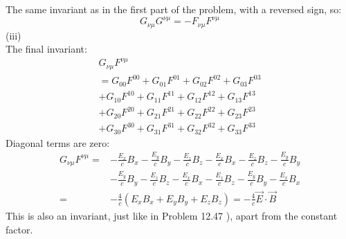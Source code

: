 \documentclass[UTF8]{ctexart}
\begin{document}
	The same invariant as in the first part of the problem, with a reversed sign, so:\\
	$$G_{\nu \mu} G^{\nu \mu}=-F_{\nu \mu} F^{\nu \mu}$$
	(iii)\\
	The final invariant:\\
	$$\begin{array}{c}
		G_{\nu \mu} F^{\nu \mu} \\
		=G_{00} F^{00}+G_{01} F^{01}+G_{02} F^{02}+G_{03} F^{03} \\
		+G_{10} F^{10}+G_{11} F^{11}+G_{12} F^{12}+G_{13} F^{13} \\
		+G_{20} F^{20}+G_{21} F^{21}+G_{22} F^{22}+G_{23} F^{23} \\
		+G_{30} F^{30}+G_{31} F^{31}+G_{32} F^{32}+G_{33} F^{33}
	\end{array}$$
	Diagonal terms are zero:\\
	$$\begin{aligned}
	G_{\nu \mu} F^{\nu \mu}=&-\frac{E_{x}}{c} B_{x}-\frac{E_{y}}{c} B_{y}-\frac{E_{z}}{c} B_{z}-\frac{E_{x}}{c} B_{x}-\frac{E_{z}}{c} B_{z}-\frac{E_{y}}{c} B_{y} \\
	&-\frac{E_{y}}{c} B_{y}-\frac{E_{z}}{c} B_{z}-\frac{E_{x}}{c} B_{x}-\frac{E_{z}}{c} B_{z}-\frac{E_{y}}{c} B_{y}-\frac{E_{x}}{c} B_{x} \\
	=&-\frac{4}{c}\left(E_{x} B_{x}+E_{y} B_{y}+E_{z} B_{z}\right)=-\frac{4}{c} \vec{E} \cdot \vec{B}
	\end{aligned}$$
	This is also an invariant, just like in Problem 12.47 ), apart from the constant factor.
	
\end{document}
